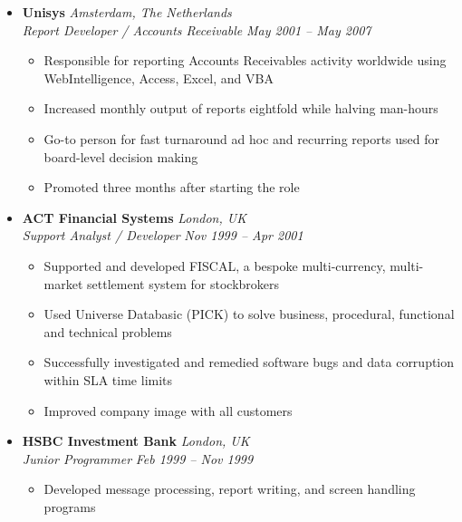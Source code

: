 \documentclass[11pt,a4paper]{article}
\begin{document}
\begin{itemize}[leftmargin=0pt,label={},itemsep=2em]
\item \textbf{Unisys} \hfill \textit{Amsterdam, The Netherlands}\\[2pt]
\textit{Report Developer / Accounts Receivable} \hfill \textit{May 2001 -- May 2007}\\[1pt]
\begin{itemize}[leftmargin=*,topsep=0pt,parsep=0pt,partopsep=0pt]
    \item Responsible for reporting Accounts Receivables activity worldwide using WebIntelligence, Access, Excel, and VBA
    \item Increased monthly output of reports eightfold while halving man-hours
    \item Go-to person for fast turnaround ad hoc and recurring reports used for board-level decision making
    \item Promoted three months after starting the role
\end{itemize}

\item \textbf{ACT Financial Systems} \hfill \textit{London, UK}\\[2pt]
\textit{Support Analyst / Developer} \hfill \textit{Nov 1999 -- Apr 2001}\\[1pt]
\begin{itemize}[leftmargin=*,topsep=0pt,parsep=0pt,partopsep=0pt]
    \item Supported and developed FISCAL, a bespoke multi-currency, multi-market settlement system for stockbrokers
    \item Used Universe Databasic (PICK) to solve business, procedural, functional and technical problems
    \item Successfully investigated and remedied software bugs and data corruption within SLA time limits
    \item Improved company image with all customers
\end{itemize}

\item \textbf{HSBC Investment Bank} \hfill \textit{London, UK}\\[2pt]
\textit{Junior Programmer} \hfill \textit{Feb 1999 -- Nov 1999}\\[1pt]
\begin{itemize}[leftmargin=*,topsep=0pt,parsep=0pt,partopsep=0pt]
    \item Developed message processing, report writing, and screen handling programs
\end{itemize}


\end{itemize}
\end{document}
